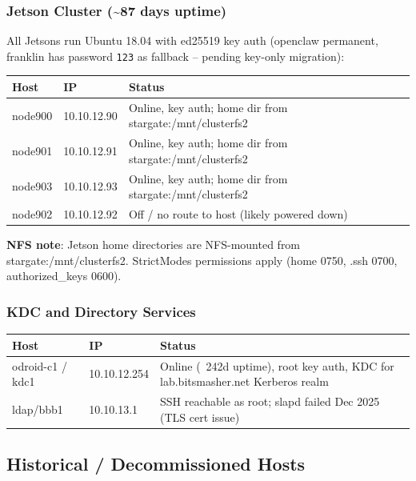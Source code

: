 \subsubsection*{Jetson Cluster (\textasciitilde 87 days uptime)}

All Jetsons run Ubuntu 18.04 with ed25519 key auth (openclaw permanent, franklin has password \texttt{123} as fallback -- pending key-only migration):

\begin{tabularx}{\textwidth}{l l X}
\textbf{Host} & \textbf{IP} & \textbf{Status} \\
\hline
node900 & 10.10.12.90 & Online, key auth; home dir from stargate:/mnt/clusterfs2 \\
node901 & 10.10.12.91 & Online, key auth; home dir from stargate:/mnt/clusterfs2 \\
node903 & 10.10.12.93 & Online, key auth; home dir from stargate:/mnt/clusterfs2 \\
node902 & 10.10.12.92 & Off / no route to host (likely powered down) \\
\hline
\end{tabularx}

\textbf{NFS note}: Jetson home directories are NFS-mounted from stargate:/mnt/clusterfs2. StrictModes permissions apply (home 0750, .ssh 0700, authorized\_keys 0600).

\subsubsection*{KDC and Directory Services}

\begin{tabularx}{\textwidth}{l l X}
\textbf{Host} & \textbf{IP} & \textbf{Status} \\
\hline
odroid-c1 / kdc1 & 10.10.12.254 & Online (~242d uptime), root key auth, KDC for lab.bitsmasher.net Kerberos realm \\
ldap/bbb1 & 10.10.13.1 & SSH reachable as root; slapd failed Dec 2025 (TLS cert issue) \\
\hline
\end{tabularx}

\subsection{Historical / Decommissioned Hosts}

